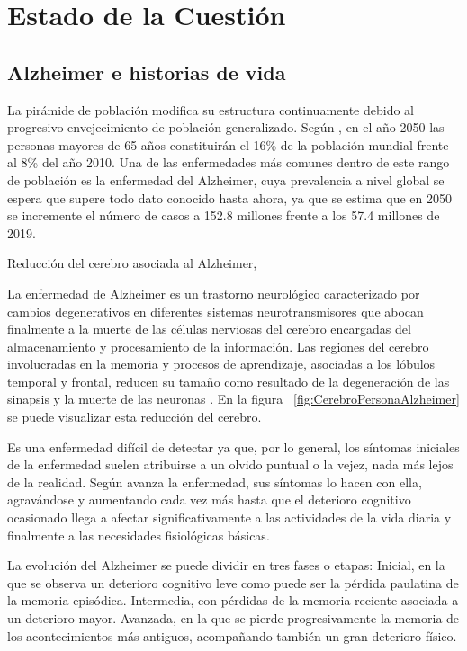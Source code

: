 \chapter{Estado de la Cuestión}
\label{cap:estadoDeLaCuestion}


\section{Alzheimer e historias de vida}
La pirámide de población modifica su estructura continuamente debido al progresivo envejecimiento de población generalizado. Según \cite{estalz}, en el año 2050 las personas mayores de 65 años constituirán el 16\% de la población mundial frente al 8\%  del año 2010. Una de las enfermedades más comunes dentro de este rango de población es la enfermedad del Alzheimer, cuya prevalencia a nivel global se espera que supere todo dato conocido hasta ahora, ya que se estima que en 2050 se incremente el número de casos a 152.8 millones frente a los 57.4 millones de 2019. 

%
{Reducción del cerebro asociada al Alzheimer, \citet{mattson2004pathways}}

La enfermedad de Alzheimer es un trastorno neurológico caracterizado por cambios degenerativos en diferentes sistemas neurotransmisores que abocan finalmente a la muerte de las células nerviosas del cerebro encargadas del almacenamiento y procesamiento de la información. Las regiones del cerebro involucradas en la memoria y procesos de aprendizaje, asociadas a los lóbulos temporal y frontal, reducen su tamaño como resultado de la degeneración de las sinapsis y la muerte de las neuronas \citep{romano2007enfermedad,mattson2004pathways}. En la figura ~\ref{fig:CerebroPersonaAlzheimer} se puede visualizar esta reducción del cerebro.

Es una enfermedad difícil de detectar ya que, por lo general, los síntomas iniciales de la enfermedad suelen atribuirse a un olvido puntual o la vejez, nada más lejos de la realidad. Según avanza la enfermedad, sus síntomas lo hacen con ella, agravándose y aumentando cada vez más hasta que el deterioro cognitivo ocasionado llega a afectar significativamente a las actividades de la vida diaria y finalmente a las necesidades fisiológicas básicas.

La evolución del Alzheimer se puede dividir en tres fases o etapas: Inicial, en la que se observa un deterioro cognitivo leve como puede ser la pérdida paulatina de la memoria episódica. Intermedia, con pérdidas de la memoria reciente asociada a un deterioro mayor. Avanzada, en la que se pierde progresivamente la memoria de los acontecimientos más antiguos, acompañando también un gran deterioro físico.

